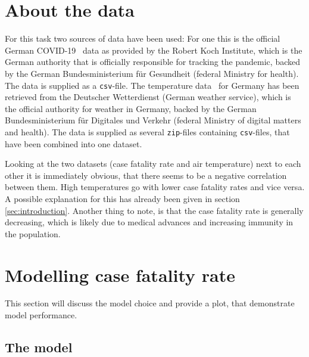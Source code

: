\documentclass{article}
\begin{document}
\section{About the data}

For this task two sources of data have been used: For one this is the official German COVID-19~\cite{rki_2022} data as provided by the Robert Koch Institute, which is the German authority that is officially responsible for tracking the pandemic, backed by the German Bundesministerium für Gesundheit (federal Ministry for health). The data is supplied as a \texttt{csv}-file. The temperature data~\cite{dwd_2022} for Germany has been retrieved from the Deutscher Wetterdienst (German weather service), which is the official authority for weather in Germany, backed by the German Bundesministerium für Digitales und Verkehr (federal Ministry of digital matters and health). The data is supplied as several \texttt{zip}-files containing \texttt{csv}-files, that have been combined into one dataset.

Looking at the two datasets (case fatality rate and air temperature) next to each other it is immediately obvious, that there seems to be a negative correlation between them. High temperatures go with lower case fatality rates and vice versa. A possible explanation for this has already been given in section \ref{sec:introduction}. Another thing to note, is that the case fatality rate is generally decreasing, which is likely due to medical advances and increasing immunity in the population.

\section{Modelling case fatality rate}
\label{sec:modelling}

This section will discuss the model choice and provide a plot, that demonstrate model performance.

\subsection{The model}
\end{document}
